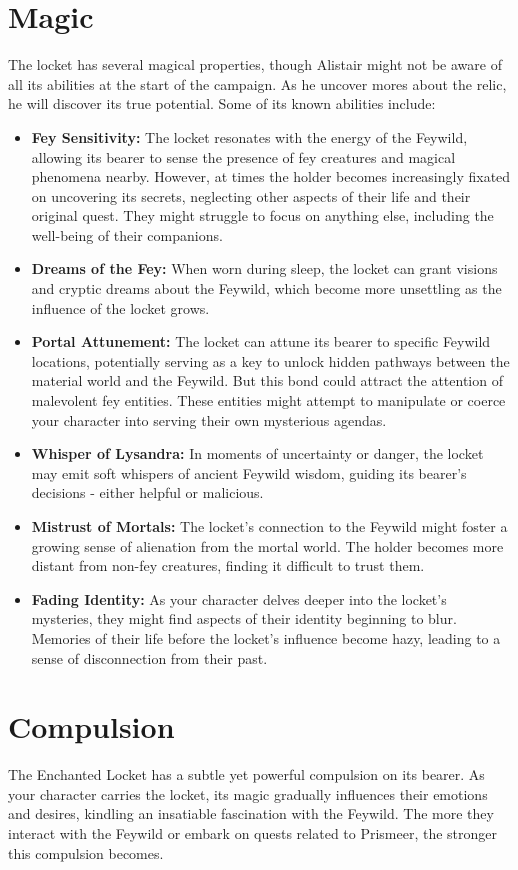 \documentclass[letterpaper,openany,oneside,twocolumn]{book}
\begin{document}
\section*{Magic}
The locket has several magical properties, though Alistair might not be aware of all its abilities at the start of the campaign. As he uncover mores about the relic, he will discover its true potential. Some of its known abilities include:
\begin{itemize}
	\item \textbf{Fey Sensitivity:} The locket resonates with the energy of the Feywild, allowing its bearer to sense the presence of fey creatures and magical phenomena nearby. However, at times the holder becomes increasingly fixated on uncovering its secrets, neglecting other aspects of their life and their original quest. They might struggle to focus on anything else, including the well-being of their companions.
	\item \textbf{Dreams of the Fey:} When worn during sleep, the locket can grant visions and cryptic dreams about the Feywild, which become more unsettling as the influence of the locket grows.
	\item \textbf{Portal Attunement:} The locket can attune its bearer to specific Feywild locations, potentially serving as a key to unlock hidden pathways between the material world and the Feywild. But this bond could attract the attention of malevolent fey entities. These entities might attempt to manipulate or coerce your character into serving their own mysterious agendas.
	\item \textbf{Whisper of Lysandra:} In moments of uncertainty or danger, the locket may emit soft whispers of ancient Feywild wisdom, guiding its bearer's decisions - either helpful or malicious.
	\item \textbf{Mistrust of Mortals:} The locket's connection to the Feywild might foster a growing sense of alienation from the mortal world. The holder becomes more distant from non-fey creatures, finding it difficult to trust them.
	\item \textbf{Fading Identity:} As your character delves deeper into the locket's mysteries, they might find aspects of their identity beginning to blur. Memories of their life before the locket's influence become hazy, leading to a sense of disconnection from their past.
\end{itemize}
\section*{Compulsion}
The Enchanted Locket has a subtle yet powerful compulsion on its bearer. As your character carries the locket, its magic gradually influences their emotions and desires, kindling an insatiable fascination with the Feywild. The more they interact with the Feywild or embark on quests related to Prismeer, the stronger this compulsion becomes.
\end{document}
